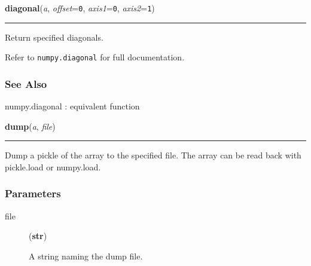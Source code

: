     \label{numpy:ndarray:diagonal}

    \vspace{0.5ex}

    \begin{boxedminipage}{\textwidth}

    \raggedright \textbf{diagonal}(\textit{a}, \textit{offset}=\texttt{0}, \textit{axis1}=\texttt{0}, \textit{axis2}=\texttt{1})

    \vspace{-1.5ex}

    \rule{\textwidth}{0.5\fboxrule}

Return specified diagonals.

Refer to \texttt{numpy.diagonal} for full documentation.



\hypertarget{see-also}{}
\subsubsection*{See Also}

numpy.diagonal : equivalent function
    \vspace{1ex}

    \end{boxedminipage}

    \label{numpy:ndarray:dump}

    \vspace{0.5ex}

    \begin{boxedminipage}{\textwidth}

    \raggedright \textbf{dump}(\textit{a}, \textit{file})

    \vspace{-1.5ex}

    \rule{\textwidth}{0.5\fboxrule}

Dump a pickle of the array to the specified file.
The array can be read back with pickle.load or numpy.load.



\hypertarget{parameters}{}
\subsubsection*{Parameters}
\begin{description}
\item[{file}] (\textbf{str})

A string naming the dump file.

\end{description}
    \vspace{1ex}

    \end{boxedminipage}

